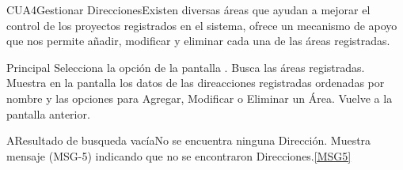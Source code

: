 
	\begin{UseCase}{CUA4}{Gestionar Direcciones}{Existen diversas áreas que ayudan a mejorar el control de los proyectos registrados en el sistema, ofrece un mecanismo de apoyo que nos permite añadir, modificar y eliminar cada una de las áreas registradas.}
	\end{UseCase}
	
	
	
	
	
	\begin{UCtrayectoria}{Principal}
		\UCpaso[\UCactor] Selecciona la opción  de la pantalla .
		\UCpaso Busca las áreas registradas. \label{paso:CUA4buscarAreas}
		\UCpaso Muestra en la pantalla  los datos de las direacciones registradas ordenadas por nombre y las opciones para Agregar, Modificar o Eliminar un Área.  
		\UCpaso Vuelve a la pantalla anterior. 
	\end{UCtrayectoria}

	\begin{UCtrayectoriaA}{A}{Resultado de busqueda vacía}{No se encuentra ninguna Dirección.}
		\UCpaso Muestra mensaje (MSG-5) indicando que no se encontraron Direcciones.\ref{MSG5}
	\end{UCtrayectoriaA}


